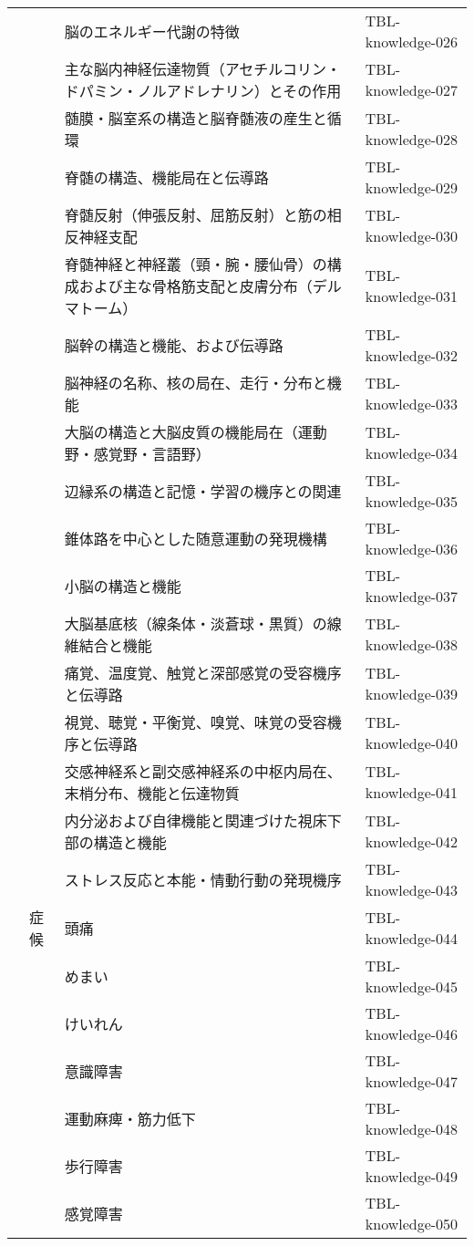 \begin{xltabular}{\linewidth}{XXXX}
 &  & 脳のエネルギー代謝の特徴 & TBL-knowledge-026 \\
 &  & 主な脳内神経伝達物質（アセチルコリン・ドパミン・ノルアドレナリン）とその作用 & TBL-knowledge-027 \\
 &  & 髄膜・脳室系の構造と脳脊髄液の産生と循環 & TBL-knowledge-028 \\
 &  & 脊髄の構造、機能局在と伝導路 & TBL-knowledge-029 \\
 &  & 脊髄反射（伸張反射、屈筋反射）と筋の相反神経支配 & TBL-knowledge-030 \\
 &  & 脊髄神経と神経叢（頸・腕・腰仙骨）の構成および主な骨格筋支配と皮膚分布（デルマトーム） & TBL-knowledge-031 \\
 &  & 脳幹の構造と機能、および伝導路 & TBL-knowledge-032 \\
 &  & 脳神経の名称、核の局在、走行・分布と機能 & TBL-knowledge-033 \\
 &  & 大脳の構造と大脳皮質の機能局在（運動野・感覚野・言語野） & TBL-knowledge-034 \\
 &  & 辺縁系の構造と記憶・学習の機序との関連 & TBL-knowledge-035 \\
 &  & 錐体路を中心とした随意運動の発現機構 & TBL-knowledge-036 \\
 &  & 小脳の構造と機能 & TBL-knowledge-037 \\
 &  & 大脳基底核（線条体・淡蒼球・黒質）の線維結合と機能 & TBL-knowledge-038 \\
 &  & 痛覚、温度覚、触覚と深部感覚の受容機序と伝導路 & TBL-knowledge-039 \\
 &  & 視覚、聴覚・平衡覚、嗅覚、味覚の受容機序と伝導路 & TBL-knowledge-040 \\
 &  & 交感神経系と副交感神経系の中枢内局在、末梢分布、機能と伝達物質 & TBL-knowledge-041 \\
 &  & 内分泌および自律機能と関連づけた視床下部の構造と機能 & TBL-knowledge-042 \\
 &  & ストレス反応と本能・情動行動の発現機序 & TBL-knowledge-043 \\
 & 症候 & 頭痛 & TBL-knowledge-044 \\
 &  & めまい & TBL-knowledge-045 \\
 &  & けいれん & TBL-knowledge-046 \\
 &  & 意識障害 & TBL-knowledge-047 \\
 &  & 運動麻痺・筋力低下 & TBL-knowledge-048 \\
 &  & 歩行障害 & TBL-knowledge-049 \\
 &  & 感覚障害 & TBL-knowledge-050 \\

\end{xltabular}
